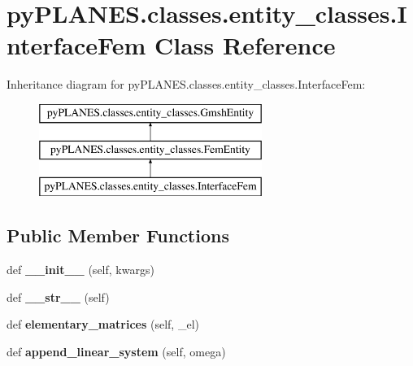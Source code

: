 \hypertarget{classpy_p_l_a_n_e_s_1_1classes_1_1entity__classes_1_1_interface_fem}{}\section{py\+P\+L\+A\+N\+E\+S.\+classes.\+entity\+\_\+classes.\+Interface\+Fem Class Reference}
\label{classpy_p_l_a_n_e_s_1_1classes_1_1entity__classes_1_1_interface_fem}
Inheritance diagram for py\+P\+L\+A\+N\+E\+S.\+classes.\+entity\+\_\+classes.\+Interface\+Fem\+:\begin{figure}[H]
\begin{center}
\leavevmode
\includegraphics[height=3.000000cm]{classpy_p_l_a_n_e_s_1_1classes_1_1entity__classes_1_1_interface_fem}
\end{center}
\end{figure}
\subsection*{Public Member Functions}
\begin{DoxyCompactItemize}
\item 
\mbox{\label{classpy_p_l_a_n_e_s_1_1classes_1_1entity__classes_1_1_interface_fem_a665daecfc7e625e9d8c44e0dbb1eca69}} 
def {\bfseries \+\_\+\+\_\+init\+\_\+\+\_\+} (self, kwargs)
\item 
\mbox{\label{classpy_p_l_a_n_e_s_1_1classes_1_1entity__classes_1_1_interface_fem_ab3b07eda6749c1306705aeaded78831b}} 
def {\bfseries \+\_\+\+\_\+str\+\_\+\+\_\+} (self)
\item 
\mbox{\label{classpy_p_l_a_n_e_s_1_1classes_1_1entity__classes_1_1_interface_fem_a4e86e4b7b127ebefaa2629f38c35d8cc}} 
def {\bfseries elementary\+\_\+matrices} (self, \+\_\+el)
\item 
\mbox{\label{classpy_p_l_a_n_e_s_1_1classes_1_1entity__classes_1_1_interface_fem_a2c6a0791e2cc041d7ff35ad12a5985df}} 
def {\bfseries append\+\_\+linear\+\_\+system} (self, omega)
\end{DoxyCompactItemize}

